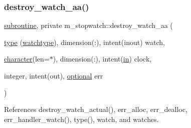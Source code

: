 \subsubsection{\texorpdfstring{destroy\+\_\+watch\+\_\+aa()}{destroy\_watch\_aa()}}
{\footnotesize\ttfamily \hyperlink{M__stopwatch_83_8txt_acfbcff50169d691ff02d4a123ed70482}{subroutine}, private m\+\_\+stopwatch\+::destroy\+\_\+watch\+\_\+aa (\begin{DoxyParamCaption}\item[{\hyperlink{stop__watch_83_8txt_a70f0ead91c32e25323c03265aa302c1c}{type} (\hyperlink{structm__stopwatch_1_1watchtype}{watchtype}), dimension(\+:), intent(inout)}]{watch,  }\item[{\hyperlink{option__stopwatch_83_8txt_abd4b21fbbd175834027b5224bfe97e66}{character}(len=$\ast$), dimension(\+:), intent(\hyperlink{M__journal_83_8txt_afce72651d1eed785a2132bee863b2f38}{in})}]{clock,  }\item[{integer, intent(out), \hyperlink{option__stopwatch_83_8txt_aa4ece75e7acf58a4843f70fe18c3ade5}{optional}}]{err }\end{DoxyParamCaption})\hspace{0.3cm}{\ttfamily [private]}}



References destroy\+\_\+watch\+\_\+actual(), err\+\_\+alloc, err\+\_\+dealloc, err\+\_\+handler\+\_\+watch(), type(), watch, and watches.


